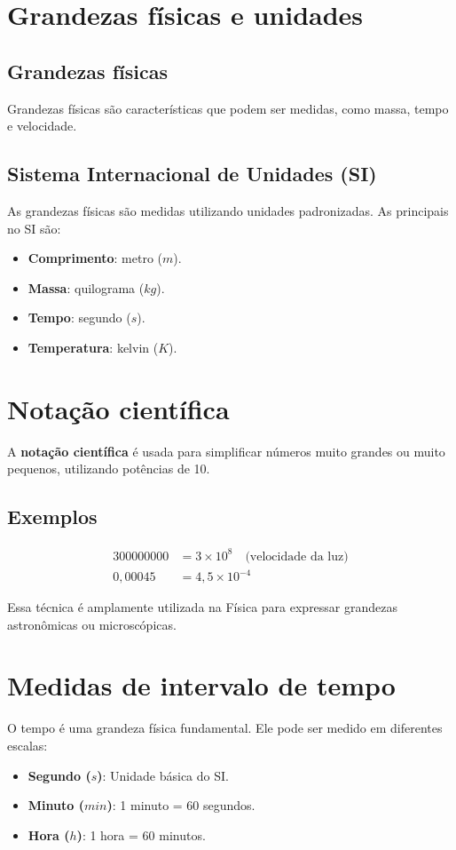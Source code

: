 	\section{Grandezas físicas e unidades}
	\subsection*{Grandezas físicas}
	Grandezas físicas são características que podem ser medidas, como massa, tempo e velocidade.
	
	\subsection*{Sistema Internacional de Unidades (SI)}
	As grandezas físicas são medidas utilizando unidades padronizadas. As principais no SI são:
	\begin{itemize}
		\item \textbf{Comprimento}: metro (\(m\)).
		\item \textbf{Massa}: quilograma (\(kg\)).
		\item \textbf{Tempo}: segundo (\(s\)).
		\item \textbf{Temperatura}: kelvin (\(K\)).
	\end{itemize}
	
	\section{Notação científica}
	A \textbf{notação científica} é usada para simplificar números muito grandes ou muito pequenos, utilizando potências de 10.
	
	\subsection*{Exemplos}
	\begin{align*}
		300000000 & = 3 \times 10^8 \quad \text{(velocidade da luz)} \\
		0,00045 & = 4,5 \times 10^{-4}
	\end{align*}
	
	Essa técnica é amplamente utilizada na Física para expressar grandezas astronômicas ou microscópicas.
	
	\section{Medidas de intervalo de tempo}
	O tempo é uma grandeza física fundamental. Ele pode ser medido em diferentes escalas:
	\begin{itemize}
		\item \textbf{Segundo (\(s\))}: Unidade básica do SI.
		\item \textbf{Minuto (\(min\))}: 1 minuto = 60 segundos.
		\item \textbf{Hora (\(h\))}: 1 hora = 60 minutos.
	\end{itemize}
	
